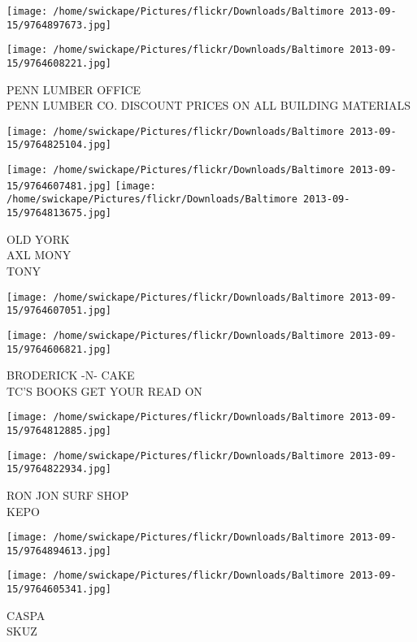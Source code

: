 \documentclass[10pt,letterpaper]{article}
\begin{document}
\texttt{[image: /home/swickape/Pictures/flickr/Downloads/Baltimore 2013-09-15/9764897673.jpg]}

\vspace{0.25in}
\texttt{[image: /home/swickape/Pictures/flickr/Downloads/Baltimore 2013-09-15/9764608221.jpg]}

PENN LUMBER OFFICE\\
PENN LUMBER CO. DISCOUNT PRICES ON ALL BUILDING MATERIALS
\pagebreak

\texttt{[image: /home/swickape/Pictures/flickr/Downloads/Baltimore 2013-09-15/9764825104.jpg]}

\vspace{0.25in}
\texttt{[image: /home/swickape/Pictures/flickr/Downloads/Baltimore 2013-09-15/9764607481.jpg]}
\texttt{[image: /home/swickape/Pictures/flickr/Downloads/Baltimore 2013-09-15/9764813675.jpg]}

OLD YORK\\
AXL MONY\\
TONY
\pagebreak

\texttt{[image: /home/swickape/Pictures/flickr/Downloads/Baltimore 2013-09-15/9764607051.jpg]}

\vspace{0.25in}
\texttt{[image: /home/swickape/Pictures/flickr/Downloads/Baltimore 2013-09-15/9764606821.jpg]}

BRODERICK {-}N{-} CAKE\\
TC'S BOOKS GET YOUR READ ON
\pagebreak

\texttt{[image: /home/swickape/Pictures/flickr/Downloads/Baltimore 2013-09-15/9764812885.jpg]}

\vspace{0.25in}
\texttt{[image: /home/swickape/Pictures/flickr/Downloads/Baltimore 2013-09-15/9764822934.jpg]}

RON JON SURF SHOP\\
KEPO
\pagebreak

\texttt{[image: /home/swickape/Pictures/flickr/Downloads/Baltimore 2013-09-15/9764894613.jpg]}

\vspace{0.25in}
\texttt{[image: /home/swickape/Pictures/flickr/Downloads/Baltimore 2013-09-15/9764605341.jpg]}

CASPA\\
SKUZ
\pagebreak
\end{document}
